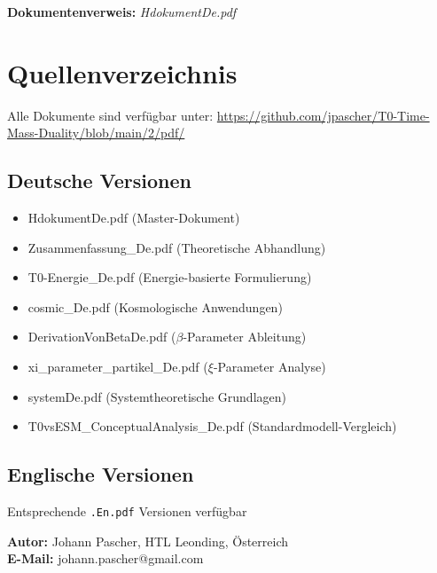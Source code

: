\documentclass[12pt,a4paper]{article}
\newcommand{\xipar}{\xi}
\begin{document}
	\textbf{Dokumentenverweis:} \textit{HdokumentDe.pdf}
	
	\section{Quellenverzeichnis}
	
	Alle Dokumente sind verfügbar unter: \url{https://github.com/jpascher/T0-Time-Mass-Duality/blob/main/2/pdf/}
	
	\subsection{Deutsche Versionen}
	
	\begin{itemize}
		\item HdokumentDe.pdf (Master-Dokument)
		\item Zusammenfassung\_De.pdf (Theoretische Abhandlung)
		\item T0-Energie\_De.pdf (Energie-basierte Formulierung)
		\item cosmic\_De.pdf (Kosmologische Anwendungen)
		\item DerivationVonBetaDe.pdf ($\beta$-Parameter Ableitung)
		\item xi\_parameter\_partikel\_De.pdf ($\xipar$-Parameter Analyse)
		\item systemDe.pdf (Systemtheoretische Grundlagen)
		\item T0vsESM\_ConceptualAnalysis\_De.pdf (Standardmodell-Vergleich)
	\end{itemize}
	
	\subsection{Englische Versionen}
	
	Entsprechende \texttt{.En.pdf} Versionen verfügbar
	
	\textbf{Autor:} Johann Pascher, HTL Leonding, Österreich\\
	\textbf{E-Mail:} johann.pascher@gmail.com
	
\end{document}
